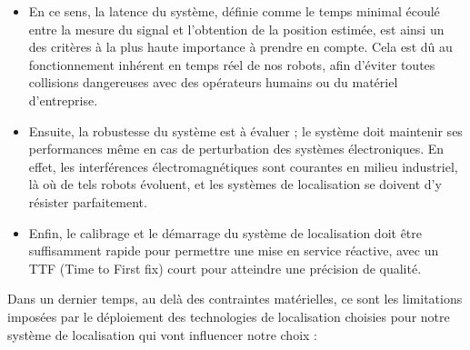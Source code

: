 \documentclass[11pt, a4paper]{article}
\begin{document}
\begin{itemize}
	\item En ce sens, la latence du système, définie comme le temps minimal écoulé entre la mesure du signal et l’obtention de la position estimée,  est ainsi un des critères à la plus haute importance à prendre en compte. Cela est dû au fonctionnement inhérent en temps réel de nos robots, afin d’éviter toutes collisions dangereuses avec des opérateurs humains ou du matériel d’entreprise. 
	\item Ensuite, la robustesse du système est à évaluer ;  le système doit maintenir ses performances même en cas de perturbation des systèmes électroniques. En effet, les interférences électromagnétiques sont courantes en milieu industriel, là où de tels robots évoluent, et les systèmes de localisation se doivent d’y résister parfaitement. 
	\item Enfin, le calibrage et le démarrage du système de localisation doit être suffisamment rapide pour permettre une mise en service réactive, avec un TTF (Time to First fix) court pour atteindre une précision de qualité. 
\end{itemize}

Dans un dernier temps, au delà des contraintes matérielles, ce sont les limitations imposées par le déploiement des technologies de localisation choisies pour notre système de localisation qui vont influencer notre choix : 
\end{document}

